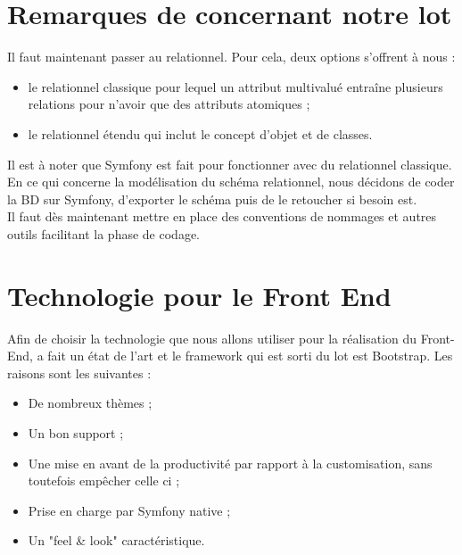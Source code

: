 \documentclass [a4paper] {article}
\begin{document}
\section{Remarques de \nomTuteurPedago{} concernant notre lot}
Il faut maintenant passer au relationnel. Pour cela, deux options s'offrent à nous : 
\begin{itemize}
	\item le relationnel classique pour lequel un attribut multivalué entraîne plusieurs relations pour n'avoir que des attributs atomiques ;
	\item le relationnel étendu qui inclut le concept d'objet et de classes.
\end{itemize}
Il est à noter que Symfony est fait pour fonctionner avec du relationnel classique. \\
En ce qui concerne la modélisation du schéma relationnel, nous décidons de coder la BD sur Symfony, d'exporter le schéma puis de le retoucher si besoin est. \\
Il faut dès maintenant mettre en place des conventions de nommages et autres outils facilitant la phase de codage.


\section{Technologie pour le Front End}
Afin de choisir la technologie que nous allons utiliser pour la réalisation du Front-End, \Matthieu{} a fait un état de l'art et le framework qui est sorti du lot est Bootstrap. Les raisons sont les suivantes : 
\begin{itemize}
	\item De nombreux thèmes ;
	\item Un bon support ;
	\item Une mise en avant de la productivité par rapport à la customisation, sans toutefois empêcher celle ci ;
	\item Prise en charge par Symfony native ;
	\item Un "feel \& look" caractéristique.
\end{itemize}
\end{document}

